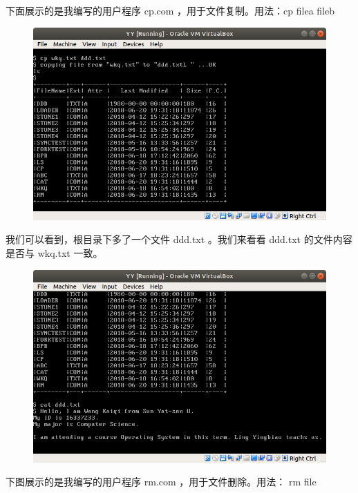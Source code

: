 \documentclass[a4paper]{article}
\begin{document}
\newpage

下面展示的是我编写的用户程序 cp.com ，用于文件复制。用法：cp filea fileb

\begin{figure}[!hbp]
\centering
\includegraphics[scale=0.5]{pics/5.png}
\end{figure}

我们可以看到，根目录下多了一个文件 ddd.txt 。我们来看看 ddd.txt 的文件内容是否与 wkq.txt 一致。

\begin{figure}[!hbp]
\centering
\includegraphics[scale=0.5]{pics/6.png}
\end{figure}

\newpage

下图展示的是我编写的用户程序 rm.com ，用于文件删除。用法： rm file
\end{document}
